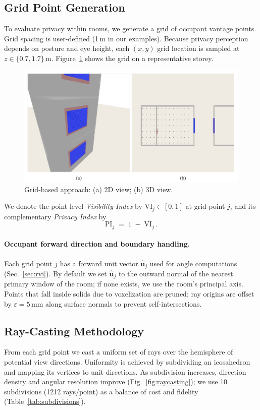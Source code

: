 \documentclass[final,3p,times,review]{elsarticle}
\begin{document}
\subsection{Grid Point Generation}
To evaluate privacy within rooms, we generate a grid of occupant vantage points. Grid spacing is user-defined (1\,m in our examples). Because privacy perception depends on posture and eye height, each $(x,y)$ grid location is sampled at $z\in\{0.7,1.7\}$\,m. Figure~\ref{fig:griding} shows the grid on a representative storey.

\begin{figure}[H]
\centering
\includegraphics[width=.6\textwidth]{Grid_based_appraoch.jpg} %
\caption{Grid-based approach: (a) 2D view; (b) 3D view.}
\label{fig:griding}
\end{figure}

We denote the point-level \emph{Visibility Index} by $\mathrm{VI}_j\in[0,1]$ at grid point $j$, and its complementary \emph{Privacy Index} by
\begin{equation}
\mathrm{PI}_j \;=\; 1 \;-\; \mathrm{VI}_j \,.
\label{eq:pi}
\end{equation}

\paragraph{Occupant forward direction and boundary handling.}
Each grid point $j$ has a forward unit vector $\hat{\mathbf{u}}_j$ used for angle computations (Sec.~\ref{sec:rvi}). By default we set $\hat{\mathbf{u}}_j$ to the outward normal of the nearest primary window of the room; if none exists, we use the room’s principal axis. Points that fall inside solids due to voxelization are pruned; ray origins are offset by $\varepsilon=5$\,mm along surface normals to prevent self-intersections.

\subsection{Ray-Casting Methodology}
\label{sec:raycasting}
From each grid point we cast a uniform set of rays over the hemisphere of potential view directions. Uniformity is achieved by subdividing an icosahedron and mapping its vertices to unit directions. As subdivision increases, direction density and angular resolution improve (Fig.~\ref{fig:raycasting}); we use 10 subdivisions (1212 rays/point) as a balance of cost and fidelity (Table~\ref{tab:subdivisions}).
\end{document}
